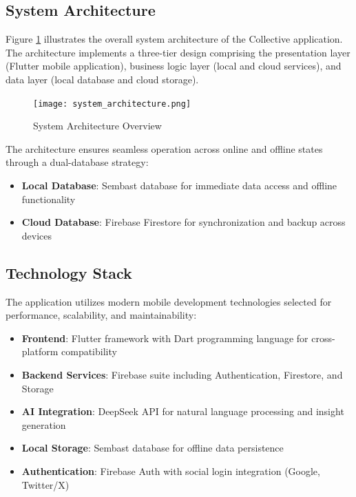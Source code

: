 \documentclass[conference]{IEEEtran}
\begin{document}
\subsection{System Architecture}

Figure \ref{fig:system_architecture} illustrates the overall system architecture of the Collective application. The architecture implements a three-tier design comprising the presentation layer (Flutter mobile application), business logic layer (local and cloud services), and data layer (local database and cloud storage).

\begin{figure}[htbp]
\centerline{\texttt{[image: system\_architecture.png]}}
\caption{System Architecture Overview}
\label{fig:system_architecture}
\end{figure}

The architecture ensures seamless operation across online and offline states through a dual-database strategy:
\begin{itemize}
\item \textbf{Local Database}: Sembast database for immediate data access and offline functionality
\item \textbf{Cloud Database}: Firebase Firestore for synchronization and backup across devices
\end{itemize}

\subsection{Technology Stack}

The application utilizes modern mobile development technologies selected for performance, scalability, and maintainability:

\begin{itemize}
\item \textbf{Frontend}: Flutter framework with Dart programming language for cross-platform compatibility
\item \textbf{Backend Services}: Firebase suite including Authentication, Firestore, and Storage
\item \textbf{AI Integration}: DeepSeek API for natural language processing and insight generation
\item \textbf{Local Storage}: Sembast database for offline data persistence
\item \textbf{Authentication}: Firebase Auth with social login integration (Google, Twitter/X)
\end{itemize}
\end{document}

